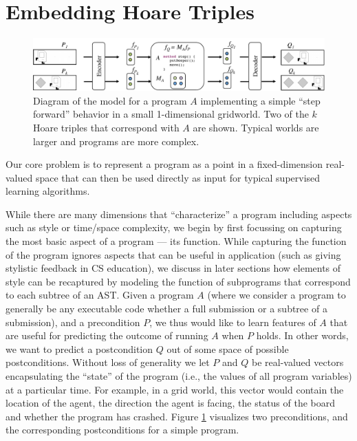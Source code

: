 \section{Embedding Hoare Triples}\label{sec:embedding}

\begin{figure}[t]
\centering
\includegraphics[width=1.0\textwidth]{img/overview}
\caption[Encoding of Hoare triples]{
Diagram of the model for a program $A$ implementing a simple ``step forward'' behavior
in a small 1-dimensional gridworld. Two of the $k$ Hoare triples that correspond with $A$ are shown. Typical worlds are larger and programs are more complex.
}
\label{fig:hoare}

\end{figure}
Our core problem is to represent a program as a point in a fixed-dimension real-valued space that can then be used directly as input for typical supervised learning algorithms.

While there are many dimensions that ``characterize'' a program including
aspects such as style or time/space complexity, we begin by 
first focussing on capturing the most basic aspect of a program --- its function.  While capturing the function of the program ignores
aspects that can be useful in application (such as giving
stylistic feedback in CS education), we discuss in later
sections how elements of style can be recaptured by modeling the
function of subprograms that correspond to each subtree of an AST.
Given a program $A$ (where we consider a program to generally be any executable code whether a full submission or a subtree of a submission), and a precondition $P$, we thus would
like to learn features of $A$ that are useful for predicting the outcome of running $A$ when $P$ holds.  In other words, we want to 
predict a postcondition $Q$ out of some space of possible postconditions. Without loss of generality we let $P$ and $Q$ be 
real-valued vectors encapsulating the ``state'' of the program (i.e., the values of all program variables)
at a particular time. For example, in a grid world, this vector would contain the location of the agent, the direction the agent is facing, the status of the board and whether the program has crashed. Figure \ref{fig:hoare} visualizes two preconditions, and the corresponding postconditions for a simple program. 

